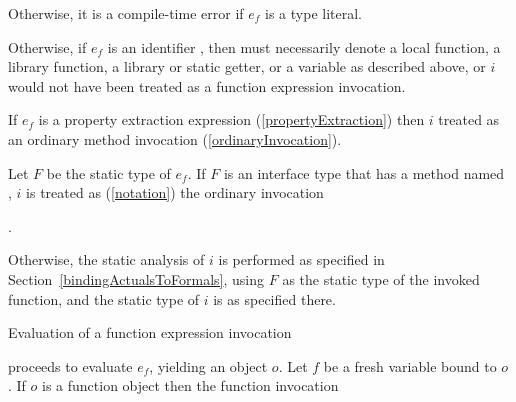 \documentclass[makeidx]{article}
\begin{document}
{\LMHash{}%
Otherwise, it is a compile-time error if $e_f$ is a type literal.


\LMHash{}%
Otherwise, if $e_f$ is an identifier \id, then \id{} must necessarily denote
a local function, a library function, a library or static getter,
or a variable as described above,
or $i$ would not have been treated as a function expression invocation.

\LMHash{}%
If $e_f$ is a property extraction expression
(\ref{propertyExtraction})
then $i$ treated as an ordinary method invocation
(\ref{ordinaryInvocation}).


\LMHash{}%
Let $F$ be the static type of $e_f$.
If $F$ is an interface type that has a method named \CALL,
$i$ is treated as
(\ref{notation})
the ordinary invocation

\noindent
{}.

\LMHash{}%
Otherwise, the static analysis of $i$ is performed as specified
in Section~\ref{bindingActualsToFormals},
using $F$ as the static type of the invoked function,
and the static type of $i$ is as specified there.

\LMHash{}%
Evaluation of a function expression invocation

\noindent
{}

\noindent
proceeds to evaluate $e_f$, yielding an object $o$.
Let $f$ be a fresh variable bound to $o$.
If $o$ is a function object then the function invocation

\noindent
{}

}
\end{document}
